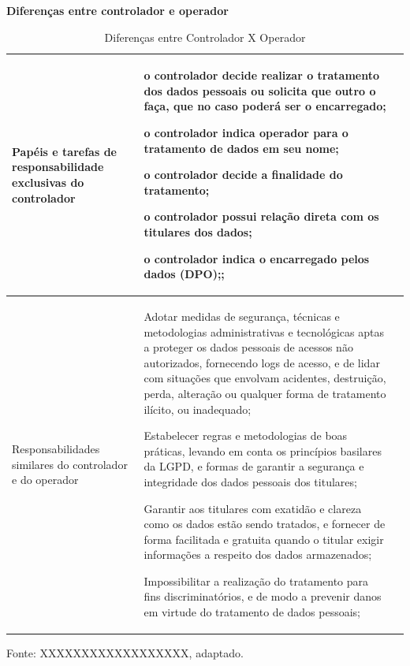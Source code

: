 \documentclass[
	12pt,				%
	openright,			%
	oneside,			%
	a4paper,			%
	english,			%
	french,				%
	spanish,			%
	brazil,				%
	]{abntex2}
\begin{document}
\begin{table}[ht]
    \centering
    \caption{Diferenças entre Controlador X Operador}
    \label{tab: Diferenças entre controlador e operador}
    \textbf{Diferenças entre controlador e operador}  \\ \hline

    \begin{tabular}{|p{4 cm}|p{11.5cm}|p{0cm}|} 
        \hline

Papéis e tarefas de responsabilidade exclusivas do controlador
&
\begin{tabitemize}
\item o controlador decide realizar o tratamento dos dados pessoais ou solicita que outro o faça, que no caso poderá ser o encarregado;
\item o controlador indica operador para o tratamento de dados em seu nome;
\item o controlador decide a finalidade do tratamento;
\item o controlador possui relação direta com os titulares dos dados;
\item o controlador indica o encarregado pelos dados (DPO);;
\end{tabitemize}\\ \hline

Responsabilidades similares do controlador e do operador
&
\begin{tabitemize}
\item Adotar medidas de segurança, técnicas e metodologias administrativas e tecnológicas aptas a proteger os dados pessoais de acessos não autorizados, fornecendo logs de acesso, e de lidar com situações que envolvam acidentes, destruição, perda, alteração ou qualquer forma de tratamento ilícito, ou inadequado;

\item Estabelecer regras e metodologias de boas práticas, levando em conta os princípios basilares da LGPD, e formas de garantir a segurança e integridade dos dados pessoais dos titulares;

\item Garantir aos titulares com exatidão e clareza como os dados estão sendo tratados, e fornecer de forma facilitada e gratuita quando o titular exigir informações a respeito dos dados armazenados;

\item Impossibilitar a realização do tratamento para fins discriminatórios, e de modo a prevenir danos em virtude do tratamento de dados pessoais;

\end{tabitemize}\\ \hline
 
    \end{tabular}
    \newline \newline Fonte: XXXXXXXXXXXXXXXXXX, adaptado.
\end{table}
\end{document}
